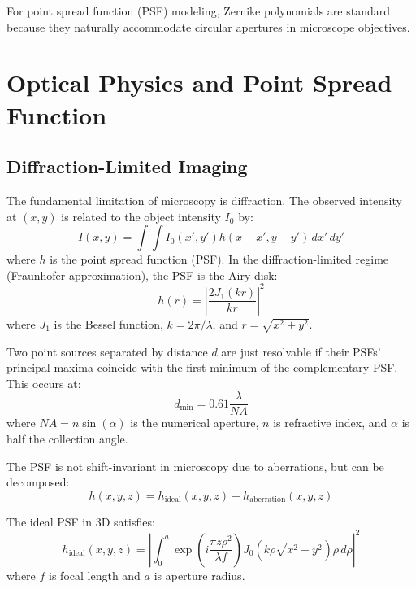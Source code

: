 \documentclass[twocolumn,11pt]{article}
\begin{document}
For point spread function (PSF) modeling, Zernike polynomials are standard because they naturally accommodate circular apertures in microscope objectives.

\section{Optical Physics and Point Spread Function}

\subsection{Diffraction-Limited Imaging}

The fundamental limitation of microscopy is diffraction. The observed intensity at $(x,y)$ is related to the object intensity $I_0$ by:
\begin{equation}
I(x,y) = \int \int I_0(x', y') h(x-x', y-y') \, dx' \, dy'
\end{equation}
where $h$ is the point spread function (PSF). In the diffraction-limited regime (Fraunhofer approximation), the PSF is the Airy disk:
\begin{equation}
h(r) = \left| \frac{2J_1(kr)}{kr} \right|^2
\end{equation}
where $J_1$ is the Bessel function, $k = 2\pi/\lambda$, and $r = \sqrt{x^2 + y^2}$.

\begin{theorem}
Two point sources separated by distance $d$ are just resolvable if their PSFs' principal maxima coincide with the first minimum of the complementary PSF. This occurs at:
\begin{equation}
d_{\min} = 0.61 \frac{\lambda}{NA}
\end{equation}
where $NA = n \sin(\alpha)$ is the numerical aperture, $n$ is refractive index, and $\alpha$ is half the collection angle.
\end{theorem}

The PSF is not shift-invariant in microscopy due to aberrations, but can be decomposed:
\begin{equation}
h(x,y,z) = h_{\text{ideal}}(x,y,z) + h_{\text{aberration}}(x,y,z)
\end{equation}

The ideal PSF in 3D satisfies:
\begin{equation}
h_{\text{ideal}}(x,y,z) = \left| \int_0^{a} \exp\left(i \frac{\pi z \rho^2}{\lambda f}\right) J_0(k\rho \sqrt{x^2+y^2}) \rho \, d\rho \right|^2
\end{equation}
where $f$ is focal length and $a$ is aperture radius.
\end{document}
